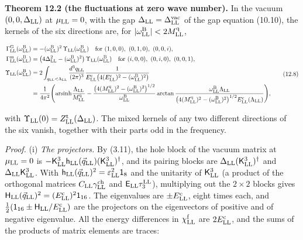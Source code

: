 \documentclass[
  10pt,
]{article}
\begin{document}
\textbf{Theorem 12.2 (the fluctuations at zero wave number).} In the
vacuum \((0,0,\Delta_{\rm LL})\) at \(\mu_{\rm LL}=0\), with the gap
\(\Delta_{\rm LL}=\Delta^{\rm vac}_{\rm LL}\) of the gap equation
(10.10), the kernels of the six directions are, for
\(\lvert\omega^{\rm B}_{\rm LL}\rvert<2M^{\rm q}_{\rm LL}\),

\[\begin{aligned}\Gamma^{\rm G}_{\rm LL}(\omega^{\rm B}_{\rm LL})&=-(\omega^{\rm B}_{\rm LL})^2\,\Upsilon_{\rm LL}(\omega^{\rm B}_{\rm LL})\quad\text{for }(1,0,0),\ (0,1,0),\ (0,0,i),\\\Gamma^{\rm m}_{\rm LL}(\omega^{\rm B}_{\rm LL})&=\big(4\Delta_{\rm LL}^2-(\omega^{\rm B}_{\rm LL})^2\big)\,\Upsilon_{\rm LL}(\omega^{\rm B}_{\rm LL})\quad\text{for }(i,0,0),\ (0,i,0),\ (0,0,1),\\\Upsilon_{\rm LL}(\omega^{\rm B}_{\rm LL})&=2\int_{q_{\rm LL}<\Lambda_{\rm LL}}\frac{d^3q_{\rm LL}}{(2\pi)^3}\frac1{E^{\rm c}_{\rm LL}\big(4(E^{\rm c}_{\rm LL})^2-(\omega^{\rm B}_{\rm LL})^2\big)}\\&=\frac1{4\pi^2}\Bigg(\mathrm{arsinh}\frac{\Lambda_{\rm LL}}{M^{\rm q}_{\rm LL}}-\frac{\big(4(M^{\rm q}_{\rm LL})^2-(\omega^{\rm B}_{\rm LL})^2\big)^{1/2}}{\omega^{\rm B}_{\rm LL}}\arctan\frac{\omega^{\rm B}_{\rm LL}\Lambda_{\rm LL}}{\big(4(M^{\rm q}_{\rm LL})^2-(\omega^{\rm B}_{\rm LL})^2\big)^{1/2}E^{\rm c}_{\rm LL}(\Lambda_{\rm LL})}\Bigg),\end{aligned}\tag{12.8}\]

with \(\Upsilon_{\rm LL}(0)=Z^{\rm t}_{\rm LL}(\Delta_{\rm LL})\). The
mixed kernels of any two different directions of the six vanish,
together with their parts odd in the frequency.

\emph{Proof.} (i) \emph{The projectors.} By (3.11), the hole block of
the vacuum matrix at \(\mu_{\rm LL}=0\) is
\(-\mathsf K^3_{\rm LL}\mathsf h_{\rm LL}(\vec q_{\rm LL})(\mathsf K^3_{\rm LL})^\dagger\),
and its pairing blocks are
\(\Delta_{\rm LL}(\mathsf K^3_{\rm LL})^\dagger\) and
\(\Delta_{\rm LL}\mathsf K^3_{\rm LL}\). With
\(\mathsf h_{\rm LL}(\vec q_{\rm LL})^2=\varepsilon_{\rm LL}^2\mathsf 1_8\)
and the unitarity of \(\mathsf K^3_{\rm LL}\) (a product of the
orthogonal matrices \(C_{\rm LL}\gamma^{\rm ch}_{\rm LL}\) and
\(\mathsf E_{\rm LL}\tau^{\rm LL}_3\)), multiplying out the \(2\times2\)
blocks gives
\(\mathsf H_{\rm LL}(\vec q_{\rm LL})^2=(E^{\rm c}_{\rm LL})^2\mathsf 1_{16}\).
The eigenvalues are \(\pm E^{\rm c}_{\rm LL}\), eight times each, and
\(\tfrac12(\mathsf 1_{16}\pm\mathsf H_{\rm LL}/E^{\rm c}_{\rm LL})\) are
the projectors on the eigenvectors of positive and of negative
eigenvalue. All the energy differences in \(\chi^{\rm f}_{\rm LL}\) are
\(2E^{\rm c}_{\rm LL}\), and the sums of the products of matrix elements
are traces:
\end{document}
